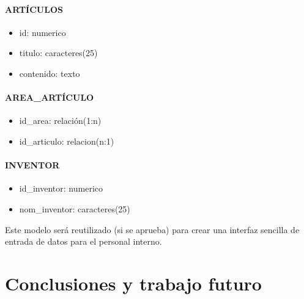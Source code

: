 \paragraph{ARTÍCULOS}
\begin{itemize}
\item id: numerico
\item titulo: caracteres(25)
\item contenido: texto
\end{itemize}

\paragraph{AREA\_ARTÍCULO}
\begin{itemize}
\item id\_area: relación(1:n)
\item id\_articulo: relacion(n:1)
\end{itemize}

\paragraph{INVENTOR}
\begin{itemize}
\item id\_inventor: numerico
\item nom\_inventor: caracteres(25)
\end{itemize}

\par Este modelo será reutilizado (si se aprueba) para crear una interfaz sencilla de entrada de datos para el personal interno.


\section{Conclusiones y trabajo futuro}


